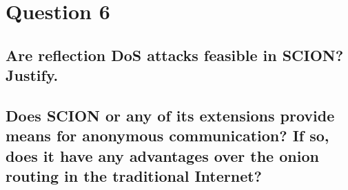 \documentclass{report}
\begin{document}
	\section{Question 6}
	\startsection
		\renewcommand{\thesubsection}{\thesection.\Alph{subsection}}
		\subsection{Are reflection DoS attacks feasible in SCION? Justify.}
		\startsubsection
		\closesection
		\subsection{Does SCION or any of its extensions provide means for anonymous communication? If so, does it have any advantages over the onion routing in the traditional Internet?}
		\startsubsection
		\closesection
	\closesection
\end{document}
